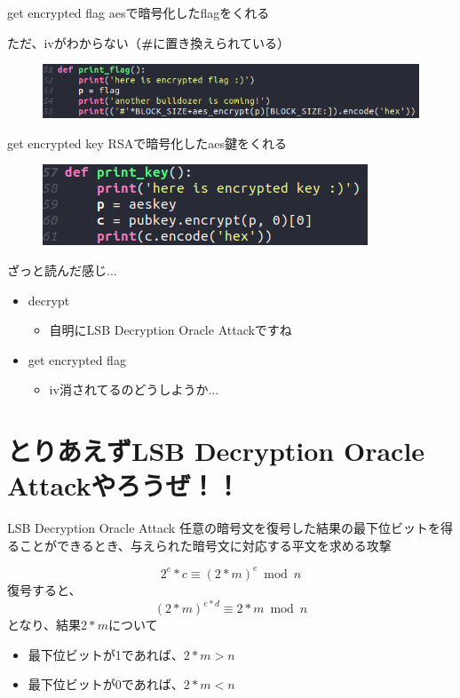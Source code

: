 \documentclass[dvipdfmx]{beamer}
\begin{document}
\begin{frame}{get encrypted flag}
  aesで暗号化したflagをくれる

  ただ、ivがわからない（{\bf \#}に置き換えられている）
  \begin{figure}
    \includegraphics[width=0.8\linewidth]{./img/print_flag.png}
  \end{figure}
\end{frame}

\begin{frame}{get encrypted key}
  RSAで暗号化したaes鍵をくれる
  \begin{figure}
    \includegraphics[scale=0.4]{./img/print_key.png}
  \end{figure}
\end{frame}

\begin{frame}{ざっと読んだ感じ...}
  \begin{itemize}
  \item decrypt
    \begin{itemize}
    \item[] 自明にLSB Decryption Oracle Attackですね
    \end{itemize}
  \item get encrypted flag
    \begin{itemize}
    \item[] iv消されてるのどうしようか...
    \end{itemize}
  \end{itemize}
\end{frame}

\section{とりあえずLSB Decryption Oracle Attackやろうぜ！！}

\begin{frame}{LSB Decryption Oracle Attack}
  任意の暗号文を復号した結果の最下位ビットを得ることができるとき、与えられた暗号文に対応する平文を求める攻撃

  \begin{equation}
    2^e * c \equiv (2*m)^e \bmod{n} \nonumber
  \end{equation}
  復号すると、
  \begin{equation}
    (2*m)^{e*d} \equiv 2*m \bmod{n} \nonumber
  \end{equation}
  となり、結果$2*m$について
  \begin{itemize}
  \item 最下位ビットが1であれば、$2*m > n$
  \item 最下位ビットが0であれば、$2*m < n$
  \end{itemize}
\end{frame}
\end{document}
